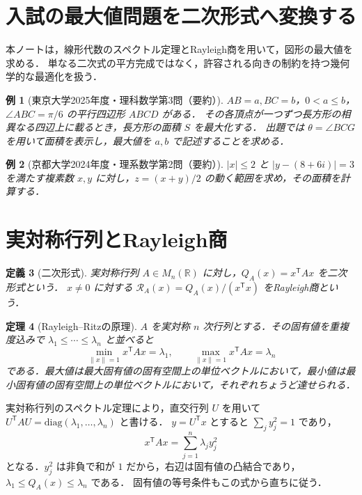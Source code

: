 \documentclass[a5paper,10pt,onecolumn]{jsarticle}
\makeatletter
\theoremstyle{mathnotetheorem}
\newtheorem{theorem}{定理}[section]
\newtheorem{definition}[theorem]{定義}
\newtheorem{example}[theorem]{例}
\renewcommand{\proofname}{証明}
\renewenvironment{proof}[1][\proofname]{%
  \par\pushQED{\qed}\normalfont\topsep4\p@\@plus2\p@\relax
  \trivlist\item[\hskip\labelsep\bfseries #1]\ignorespaces
}{\popQED\endtrivlist\@endpefalse}
\newcommand{\norm}[1]{\lVert #1\rVert}
\makeatother
\begin{document}
\section{入試の最大値問題を二次形式へ変換する}
本ノートは，線形代数のスペクトル定理とRayleigh商を用いて，図形の最大値を求める．
単なる二次式の平方完成ではなく，許容される向きの制約を持つ幾何学的な最適化を扱う．

\begin{example}[東京大学2025年度・理科数学第3問（要約）]\label{ex:tokyo}
$AB=a,BC=b$，$0<a\le b$，$\angle ABC=\pi/6$ の平行四辺形 $ABCD$ がある．
その各頂点が一つずつ長方形の相異なる四辺上に載るとき，長方形の面積 $S$ を最大化する．
出題では $\theta=\angle BCG$ を用いて面積を表示し，最大値を $a,b$ で記述することを求める．
\end{example}

\begin{example}[京都大学2024年度・理系数学第2問（要約）]\label{ex:kyoto}
$|x|\le2$ と $|y-(8+6i)|=3$ を満たす複素数 $x,y$ に対し，$z=(x+y)/2$ の動く範囲を求め，その面積を計算する．
\end{example}

\section{実対称行列とRayleigh商}
\begin{definition}[二次形式]
実対称行列 $A\in M_n(\mathbb R)$ に対し，$Q_A(x)=x^{\mathsf T}Ax$ を二次形式という．
$x\ne0$ に対する $\mathcal R_A(x)=Q_A(x)/(x^{\mathsf T}x)$ をRayleigh商という．
\end{definition}

\begin{theorem}[Rayleigh--Ritzの原理]\label{thm:rayleigh}
$A$ を実対称 $n$ 次行列とする．その固有値を重複度込みで $\lambda_1\le\cdots\le\lambda_n$ と並べると
\[
 \min_{\norm{x}=1}x^{\mathsf T}Ax=\lambda_1,\qquad
 \max_{\norm{x}=1}x^{\mathsf T}Ax=\lambda_n
\]
である．最大値は最大固有値の固有空間上の単位ベクトルにおいて，最小値は最小固有値の固有空間上の単位ベクトルにおいて，それぞれちょうど達せられる．
\end{theorem}
\begin{proof}
実対称行列のスペクトル定理により，直交行列 $U$ を用いて
$U^{\mathsf T}AU=\mathrm{diag}(\lambda_1,\ldots,\lambda_n)$ と書ける．
$y=U^{\mathsf T}x$ とすると $\sum_jy_j^2=1$ であり，
\[
 x^{\mathsf T}Ax=\sum_{j=1}^n\lambda_jy_j^2
\]
となる．$y_j^2$ は非負で和が $1$ だから，右辺は固有値の凸結合であり，$\lambda_1\le Q_A(x)\le\lambda_n$ である．
固有値の等号条件もこの式から直ちに従う．
\end{proof}
\end{document}
